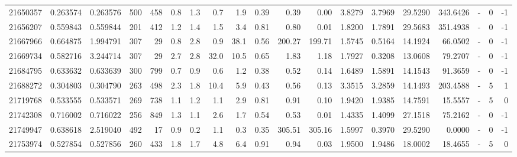 \begin{tabular}{rrrrrrrrrrrrrrrrlrr}
  21650357 & 0.263574 &   0.263576 &  500 &  458 &      0.8 &      1.3 &     0.7 &      1.9 &       0.39 &        0.39 &        0.00 &  3.8279 &  3.7969 &   29.5290 &  343.6426 &             - &        0 &         -1 \\
  21656207 & 0.559843 &   0.559844 &  201 &  412 &      1.2 &      1.4 &     1.5 &      3.4 &       0.81 &        0.80 &        0.01 &  1.8200 &  1.7891 &   29.5683 &  351.4938 &             - &        0 &         -1 \\
  21667966 & 0.664875 &   1.994791 &  307 &   29 &      0.8 &      2.8 &     0.9 &     38.1 &       0.56 &      200.27 &      199.71 &  1.5745 &  0.5164 &   14.1924 &   66.0502 &             - &        0 &         -1 \\
  21669734 & 0.582716 &   3.244714 &  307 &   29 &      2.7 &      2.8 &    32.0 &     10.5 &       0.65 &        1.83 &        1.18 &  1.7927 &  0.3208 &   13.0608 &   79.2707 &             - &        0 &         -1 \\
  21684795 & 0.633632 &   0.633639 &  300 &  799 &      0.7 &      0.9 &     0.6 &      1.2 &       0.38 &        0.52 &        0.14 &  1.6489 &  1.5891 &   14.1543 &   91.3659 &             - &        0 &         -1 \\
  21688272 & 0.304803 &   0.304790 &  263 &  498 &      2.3 &      1.8 &    10.4 &      5.9 &       0.43 &        0.56 &        0.13 &  3.3515 &  3.2859 &   14.1493 &  203.4588 &             - &        5 &          1 \\
  21719768 & 0.533555 &   0.533571 &  269 &  738 &      1.1 &      1.2 &     1.1 &      2.9 &       0.81 &        0.91 &        0.10 &  1.9420 &  1.9385 &   14.7591 &   15.5557 &             - &        5 &          0 \\
  21742308 & 0.716002 &   0.716022 &  256 &  849 &      1.3 &      1.1 &     2.6 &      1.7 &       0.54 &        0.53 &        0.01 &  1.4335 &  1.4099 &   27.1518 &   75.2162 &             - &        0 &         -1 \\
  21749947 & 0.638618 &   2.519040 &  492 &   17 &      0.9 &      0.2 &     1.1 &      0.3 &       0.35 &      305.51 &      305.16 &  1.5997 &  0.3970 &   29.5290 &    0.0000 &             - &        0 &         -1 \\
  21753974 & 0.527854 &   0.527856 &  260 &  433 &      1.8 &      1.7 &     4.8 &      6.4 &       0.91 &        0.94 &        0.03 &  1.9500 &  1.9486 &   18.0002 &   18.4655 &             - &        5 &          0 \\

\end{tabular}
